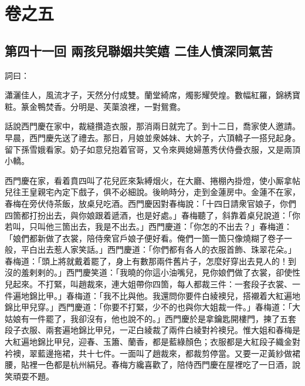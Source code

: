 \part*{{\titlename}卷之五}



\chapter*{第四十一回 兩孩兒聯姻共笑嬉 二佳人憤深同氣苦}


詞曰：

\begin{myquote}
瀟灑佳人，風流才子，天然分付成雙。蘭堂綺席，燭影耀熒煌。數幅紅羅，錦綉寶粧。篆金鴨焚香。分明是、芙蕖浪裡，一對鴛鴦。

\end{myquote}

話說西門慶在家中，裁縫攢造衣服，那消兩日就完了。到十二日，喬家使人邀請。早晨，西門慶先送了禮去。那日，月娘並衆姊妹、大妗子，六頂轎子一搭兒起身。留下孫雪娥看家。奶子如意兒抱着官哥，又令來興媳婦蕙秀伏侍疊衣服，又是兩頂小轎。

西門慶在家，看着賁四叫了花兒匠來紮縛烟火，在大廳、捲棚內掛燈，使小厮拿帖兒往王皇親宅內定下戲子，俱不必細說。後晌時分，走到金蓮房中。金蓮不在家，春梅在旁伏侍茶飯，放桌兒吃酒。西門慶因對春梅說：「十四日請衆官娘子，你們四箇都打扮出去，與你娘跟着遞酒，也是好處。」春梅聽了，斜靠着桌兒說道：「你若叫，只叫他三箇出去，我是不出去。」西門慶道：「你怎的不出去？」春梅道：「娘們都新做了衣裳，陪侍衆官戶娘子便好看。俺們一箇一箇只像燒糊了卷子一般，平白出去惹人家笑話。」西門慶道：「你們都有各人的衣服首飾、珠翠花朵。」春梅道：「頭上將就戴着罷了，身上有數那兩件舊片子，怎麼好穿出去見人的！到沒的羞剌剌的。」西門慶笑道：「我曉的你這小油嘴兒，見你娘們做了衣裳，卻使性兒起來。不打緊，叫趙裁來，連大姐帶你四箇，每人都裁三件：一套段子衣裳、一件遍地錦比甲。」春梅道：「我不比與他。我還問你要件白綾襖兒，搭襯着大紅遍地錦比甲兒穿。」{}西門慶道：「你要不打緊，少不的也與你大姐裁一件。」春梅道：「大姑娘有一件罷了，我卻沒有，他也說不的。」西門慶於是拿鑰匙開樓門，揀了五套段子衣服、兩套遍地錦比甲兒，一疋白綾裁了兩件白綾對衿襖兒。惟大姐和春梅是大紅遍地錦比甲兒，迎春、玉簫、蘭香，都是藍綠顏色；衣服都是大紅段子織金對衿襖，翠藍邊拖裙，共十七件。一面叫了趙裁來，都裁剪停當。又要一疋黃紗做裙腰，貼裡一色都是杭州絹兒。春梅方纔喜歡了，陪侍西門慶在屋裡吃了一日酒，說笑頑耍不題。

